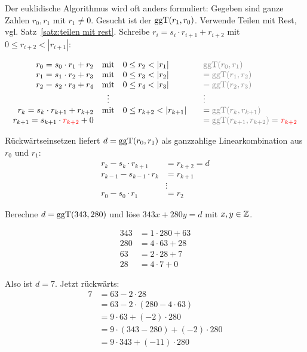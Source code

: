 	\begin{bemerkung}
		Der euklidische Algorithmus wird oft anders formuliert: \marginnote{[18]}
		Gegeben sind ganze Zahlen $r_0, r_1$ mit $r_1 \neq 0$.
		Gesucht ist der $\operatorname{ggT}(r_1,r_0)$.
		Verwende Teilen mit Rest, vgl. Satz~\ref{satz:teilen mit rest}.
		Schreibe $r_i = s_i \cdot r_{i+1} + r_{i+2}$ mit $0 \leq r_{i+2} < |r_{i+1}|$:
		
		\[
			\begin{array}{rclcl}
				r_0 = s_0 \cdot r_1 + r_2 & \text{mit} & 0 \leq r_2 < |r_1| && \textcolor{black!50}{\ggT(r_0,r_1)} \\
				r_1 = s_1 \cdot r_2 + r_3 & \text{mit} & 0 \leq r_3 < |r_2| && \textcolor{black!50}{= \ggT(r_1,r_2)} \\
				r_2 = s_2 \cdot r_3 + r_4 & \text{mit} & 0 \leq r_4 < |r_3| && \textcolor{black!50}{= \ggT(r_2,r_3)} \\
				 & \vdots & && \textcolor{black!50}{\vdots} \\
				r_k = s_k \cdot r_{k+1} + r_{k+2} & \text{mit} & 0 \leq r_{k+2} < |r_{k+1}| && = \textcolor{black!50}{\ggT(r_k,r_{k+1})}\\
				r_{k+1} = s_{k+1} \cdot \textcolor{red}{r_{k+2}} + 0 &&&& \textcolor{black!50}{=\ggT(r_{k+1},r_{k+2}) =} \ \textcolor{red}{r_{k+2}}
			\end{array}
		\]
		
		Rückwärtseinsetzen liefert $d = \operatorname{ggT}(r_0,r_1)$ als ganzzahlige Linearkombination aus $r_0$ und $r_1$:
		\begin{align*}
			r_k - s_k \cdot r_{k+1} &= r_{k+2} = d \\
			r_{k-1} - s_{k-1} \cdot r_k &= r_{k+1} \\
			&\vdots \\
			r_0 - s_0 \cdot r_1 &= r_2
		\end{align*}
	\end{bemerkung}

	\begin{beispiel}
		Berechne $d = \operatorname{ggT}(343,280)$ und löse $343x + 280y = d$ mit $x,y \in \mathbb{Z}$.
		
		\begin{align*}
			343 &= 1 \cdot 280 + 63 \\
			280 &= 4 \cdot 63  + 28 \\
			63 &= 2 \cdot 28 + 7 \\
			28 &= 4 \cdot 7 + 0
		\end{align*}
		
		Also ist $d = 7$.
		Jetzt rückwärts:
		\begin{align*}
			7 &= 63 - 2 \cdot 28 \\
			&= 63 - 2 \cdot (280 - 4 \cdot 63) \\
			&= 9 \cdot 63 + (-2) \cdot 280 \\
			&= 9 \cdot (343 - 280) + (-2) \cdot 280 \\
			&= 9 \cdot 343 + (-11) \cdot 280
		\end{align*}
	\end{beispiel}
\cleardoubleoddemptypage